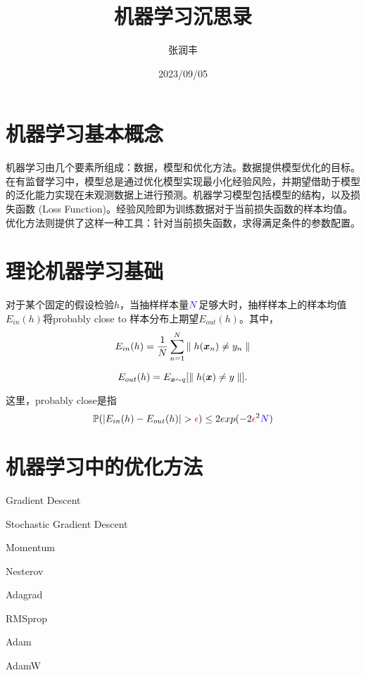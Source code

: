 \documentclass[lang=cn,newtx,10pt,scheme=chinese,color=black]{elegantbook}
\title{机器学习沉思录}
\author{张润丰}
\date{2023/09/05}
\begin{document}
\maketitle
\frontmatter

\tableofcontents

\mainmatter

\chapter{机器学习基本概念}

机器学习由几个要素所组成：数据，模型和优化方法。数据提供模型优化的目标。在有监督学习中，模型总是通过优化模型实现最小化经验风险，并期望借助于模型的泛化能力实现在未观测数据上进行预测。机器学习模型包括模型的结构，以及损失函数 (Loss Function)。经验风险即为训练数据对于当前损失函数的样本均值。优化方法则提供了这样一种工具：针对当前损失函数，求得满足条件的参数配置。

\chapter{理论机器学习基础}

\begin{theorem}[PAC理论] \label{thm:pac} 
  对于某个固定的假设检验$h$，当抽样样本量$\textcolor{blue}{N}$足够大时，抽样样本上的样本均值$E_{in}(h)$将probably close to 样本分布上期望$E_{out}(h)$。其中，
  \begin{equation}
    E_{in}(h) = \frac{1}{N}\sum_{n=1}^{N}{\parallel h(\bm{x}_n) \neq y_n \parallel} \notag
  \end{equation}

  \begin{equation}
    E_{out}(h) = E_{\bm{x}\sim q}[\parallel h(\bm{x}) \neq y \parallel]. \notag
  \end{equation}

  这里，probably close是指
  \begin{equation}
    \mathbb{P}(|E_{in}(h) - E_{out}(h)| > \textcolor{red}{\epsilon}) \leq 2exp(-2\textcolor{red}{\epsilon}^2\textcolor{blue}{N})
  \end{equation}
\end{theorem}

\chapter{机器学习中的优化方法}

\begin{introduction}
  \item Gradient Descent
  \item Stochastic Gradient Descent
  \item Momentum
  \item Nesterov
  \item Adagrad
  \item RMSprop
  \item Adam
  \item AdamW
  \end{introduction}
\end{document}
